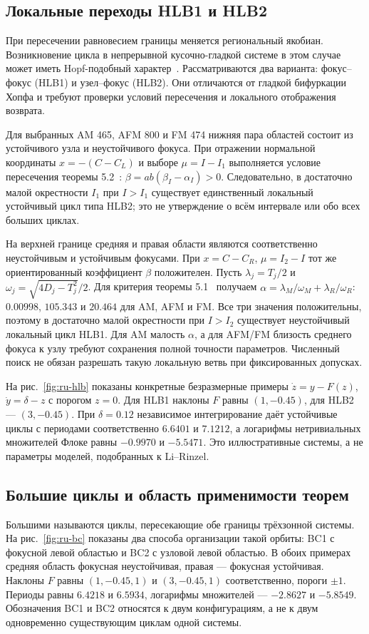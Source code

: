 \subsection{Локальные переходы HLB1 и HLB2}
При пересечении равновесием границы меняется региональный якобиан. Возникновение цикла в непрерывной кусочно-гладкой системе в этом случае может иметь Hopf-подобный характер~\cite{Simpson2022,SimpsonMeiss2007}. Рассматриваются два варианта: фокус--фокус (HLB1) и узел--фокус (HLB2). Они отличаются от гладкой бифуркации Хопфа и требуют проверки условий пересечения и локального отображения возврата.

Для выбранных AM 465, AFM 800 и FM 474 нижняя пара областей состоит из устойчивого узла и неустойчивого фокуса. При отражении нормальной координаты $x=-(C-C_L)$ и выборе $\mu=I-I_1$ выполняется условие пересечения теоремы 5.2~\cite{Simpson2022}: $\beta=ab(\beta_I-\alpha_I)>0$. Следовательно, в достаточно малой окрестности $I_1$ при $I>I_1$ существует единственный локальный устойчивый цикл типа HLB2; это не утверждение о всём интервале или обо всех больших циклах.

На верхней границе средняя и правая области являются соответственно неустойчивым и устойчивым фокусами. При $x=C-C_R$, $\mu=I_2-I$ тот же ориентированный коэффициент $\beta$ положителен. Пусть $\lambda_j=T_j/2$ и $\omega_j=\sqrt{4D_j-T_j^2}/2$. Для критерия теоремы 5.1~\cite{Simpson2022} получаем $\alpha=\lambda_M/\omega_M+\lambda_R/\omega_R$: $0.00998$, $105.343$ и $20.464$ для AM, AFM и FM. Все три значения положительны, поэтому в достаточно малой окрестности при $I>I_2$ существует неустойчивый локальный цикл HLB1. Для AM малость $\alpha$, а для AFM/FM близость среднего фокуса к узлу требуют сохранения полной точности параметров. Численный поиск не обязан разрешать такую локальную ветвь при фиксированных допусках.

На рис.~\ref{fig:ru-hlb} показаны конкретные безразмерные примеры $\dot z=y-F(z)$, $\dot y=\delta-z$ с порогом $z=0$. Для HLB1 наклоны $F$ равны $(1,-0.45)$, для HLB2 --- $(3,-0.45)$. При $\delta=0.12$ независимое интегрирование даёт устойчивые циклы с периодами соответственно $6.6401$ и $7.1212$, а логарифмы нетривиальных множителей Флоке равны $-0.9970$ и $-5.5471$. Это иллюстративные системы, а не параметры моделей, подобранных к Li--Rinzel.

\subsection{Большие циклы и область применимости теорем}
Большими называются циклы, пересекающие обе границы трёхзонной системы. На рис.~\ref{fig:ru-bc} показаны два способа организации такой орбиты: BC1 с фокусной левой областью и BC2 с узловой левой областью. В обоих примерах средняя область фокусная неустойчивая, правая --- фокусная устойчивая. Наклоны $F$ равны $(1,-0.45,1)$ и $(3,-0.45,1)$ соответственно, пороги $\pm1$. Периоды равны $6.4218$ и $6.5934$, логарифмы множителей --- $-2.8627$ и $-5.8549$. Обозначения BC1 и BC2 относятся к двум конфигурациям, а не к двум одновременно существующим циклам одной системы.

